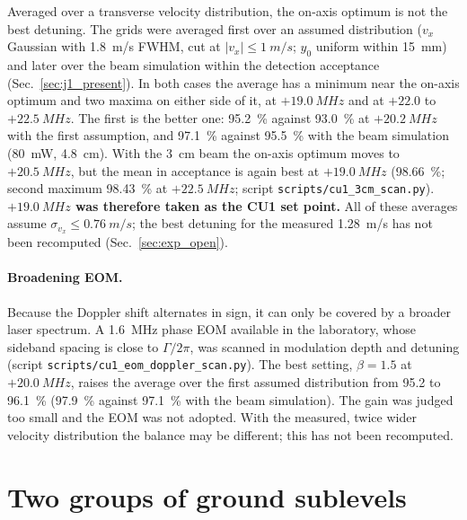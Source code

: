 \documentclass[11pt,a4paper,oneside]{report}
\newcommand{\code}[1]{\texttt{#1}}
\begin{document}
Averaged over a transverse velocity distribution, the on-axis optimum is not the best detuning.
The grids were averaged first over an assumed distribution ($v_x$ Gaussian with \SI{1.8}{m/s}
FWHM, cut at $|v_x|\leq\SI{1}{m/s}$; $y_0$ uniform within \SI{15}{mm}) and later over the beam
simulation within the detection acceptance (Sec.~\ref{sec:j1_present}). In both cases the average
has a minimum near the on-axis optimum and two maxima on either side of it, at $+\SI{19.0}{MHz}$
and at $+22.0$ to $+\SI{22.5}{MHz}$. The first is the better one: \SI{95.2}{\percent} against
\SI{93.0}{\percent} at $+\SI{20.2}{MHz}$ with the first assumption, and \SI{97.1}{\percent}
against \SI{95.5}{\percent} with the beam simulation (\SI{80}{mW}, \SI{4.8}{cm}). With the
\SI{3}{cm} beam the on-axis optimum moves to $+\SI{20.5}{MHz}$, but the mean in acceptance is again
best at $+\SI{19.0}{MHz}$ (\SI{98.66}{\percent}; second maximum \SI{98.43}{\percent} at
$+\SI{22.5}{MHz}$; script \code{scripts/cu1\_3cm\_scan.py}). \textbf{$+\SI{19.0}{MHz}$ was therefore
taken as the CU1 set point.} All of these averages assume $\sigma_{v_x}\leq\SI{0.76}{m/s}$; the best
detuning for the measured \SI{1.28}{m/s} has not been recomputed (Sec.~\ref{sec:exp_open}).

\paragraph{Broadening EOM.}
\label{sec:j1_eom}
Because the Doppler shift alternates in sign, it can only be covered by a broader laser spectrum.
A \SI{1.6}{MHz} phase EOM available in the laboratory, whose sideband spacing is close to
$\Gamma/2\pi$, was scanned in modulation depth and detuning (script
\code{scripts/cu1\_eom\_doppler\_scan.py}). The best setting, $\beta=1.5$ at $+\SI{20.0}{MHz}$,
raises the average over the first assumed distribution from 95.2 to \SI{96.1}{\percent}
(\SI{97.9}{\percent} against \SI{97.1}{\percent} with the beam simulation). The gain was judged too
small and the EOM was not adopted. With the measured, twice wider velocity distribution the balance
may be different; this has not been recomputed.

\section{Two groups of ground sublevels}
\label{sec:j1_traj19}
\end{document}
